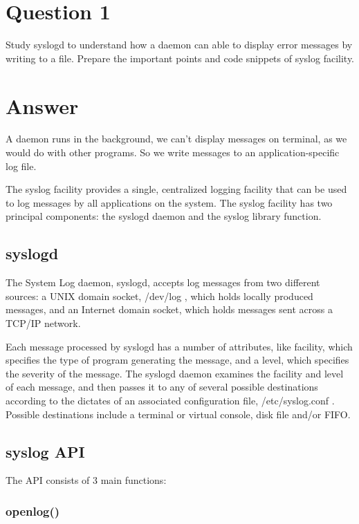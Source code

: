 \documentclass[main.tex]{subfiles}
\begin{document}
\section{Question 1}

Study syslogd to understand how a daemon can able to display error messages by
writing to a file. Prepare the important points and code snippets of syslog
facility.


\section*{Answer}

A daemon runs in the background, we can’t display messages on terminal, as we
would do with other programs. So we write messages to an application-specific
log file.

The syslog facility provides a single, centralized logging facility that can be
used to log messages by all applications on the system. The syslog facility has
two principal components: the syslogd daemon and the syslog library function.

\subsection{syslogd}

The System Log daemon, syslogd, accepts log messages from two different sources:
a UNIX domain socket, /dev/log , which holds locally produced messages, and an
Internet domain socket, which holds messages sent across a TCP/IP network.

Each message processed by syslogd has a number of attributes, like facility,
which specifies the type of program generating the message, and a level, which
specifies the severity of the message. The syslogd daemon examines the facility
and level of each message, and then passes it to any of several possible
destinations according to the dictates of an associated configuration file,
/etc/syslog.conf . Possible destinations include a terminal or virtual console,
disk file and/or FIFO.

\subsection{syslog API}

The API consists of 3 main functions:

\subsubsection{openlog()}

\end{document}
